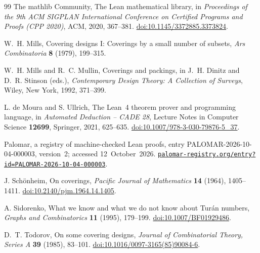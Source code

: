 \documentclass[11pt,letterpaper]{article}
\theoremstyle{definition}\newtheorem{definition}[theorem]{Definition}
\theoremstyle{remark}\newtheorem{remark}[theorem]{Remark}
\begin{document}
\begin{thebibliography}{99}
The mathlib Community, The Lean mathematical library, in
\emph{Proceedings of the 9th ACM SIGPLAN International Conference on Certified Programs and Proofs (CPP 2020)}, ACM, 2020, 367--381.
\href{https://doi.org/10.1145/3372885.3373824}{doi:10.1145/3372885.3373824}.

W.~H. Mills, Covering designs I: Coverings by a small number of subsets,
\emph{Ars Combinatoria} \textbf{8} (1979), 199--315.

W.~H. Mills and R.~C. Mullin, Coverings and packings, in J.~H. Dinitz and D.~R. Stinson (eds.),
\emph{Contemporary Design Theory: A Collection of Surveys}, Wiley, New York, 1992, 371--399.

L. de Moura and S. Ullrich, The Lean~4 theorem prover and programming language, in
\emph{Automated Deduction -- CADE 28}, Lecture Notes in Computer Science \textbf{12699}, Springer, 2021, 625--635.
\href{https://doi.org/10.1007/978-3-030-79876-5_37}{doi:10.1007/978-3-030-79876-5\_37}.

Palomar, a registry of machine-checked Lean proofs, entry PALOMAR-2026-10-04-000003, version~2;
accessed 12~October~2026.
\href{https://palomar-registry.org/entry?id=PALOMAR-2026-10-04-000003}{\nolinkurl{palomar-registry.org/entry?id=PALOMAR-2026-10-04-000003}}.

J. Sch\"onheim, On coverings,
\emph{Pacific Journal of Mathematics} \textbf{14} (1964), 1405--1411.
\href{https://doi.org/10.2140/pjm.1964.14.1405}{doi:10.2140/pjm.1964.14.1405}.

A. Sidorenko, What we know and what we do not know about Tur\'an numbers,
\emph{Graphs and Combinatorics} \textbf{11} (1995), 179--199.
\href{https://doi.org/10.1007/BF01929486}{doi:10.1007/BF01929486}.

D.~T. Todorov, On some covering designs,
\emph{Journal of Combinatorial Theory, Series A} \textbf{39} (1985), 83--101.
\href{https://doi.org/10.1016/0097-3165(85)90084-6}{doi:10.1016/0097-3165(85)90084-6}.
\end{thebibliography}
\end{document}
